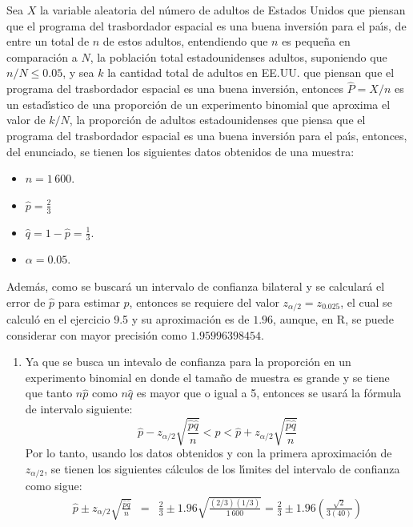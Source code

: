 \begin{solucion}
 Sea $X$ la variable aleatoria del n\'umero de adultos de Estados Unidos que piensan que el programa del trasbordador espacial es una buena inversi\'on para el pa\'{\i}s, de entre un total de $n$ de estos adultos, entendiendo que $n$ es peque\~na en comparaci\'on a $N$, la poblaci\'on total estadounidenses adultos, suponiendo que $n/N \leq 0.05$, y sea $k$ la cantidad total de adultos en EE.UU. que piensan que el programa del trasbordador espacial es una buena inversi\'on, entonces $\widehat{P} = X/n$ es un estad\'{\i}stico de una proporci\'on de un experimento binomial que aproxima el valor de $k/N$, la proporci\'on de adultos estadounidenses que piensa que el programa del trasbordador espacial es una buena inversi\'on para el pa\'{\i}s, entonces, del enunciado, se tienen los siguientes datos obtenidos de una muestra:
 \begin{itemize}
  \item $n = 1\,600$.
  \item $\hat{p}=\frac{2}{3}$
  \item $\hat{q}=1-\hat{p} = \frac{1}{3}$.
  \item $\alpha=0.05$.
 \end{itemize}
 Adem\'as, como se buscar\'a un intervalo de confianza bilateral y se calcular\'a el error de $\hat{p}$ para estimar $p$, entonces se requiere del valor $z_{\alpha/2} = z_{0.025}$, el cual se calcul\'o en el ejercicio 9.5 y su aproximaci\'on es de $1.96$, aunque, en R, se puede considerar con mayor precisi\'on como $1.95996398454$.
 \begin{enumerate}
  \item Ya que se busca un intevalo de confianza para la proporci\'on en un experimento binomial en donde el tama\~no de muestra es grande y se tiene que tanto $n\hat{p}$ como $n\hat{q}$ es mayor que o igual a 5, entonces se usar\'a la f\'ormula de intervalo siguiente:
  \begin{equation*}
   \hat{p} - z_{\alpha/2}\sqrt{\frac{\hat{p}\hat{q}}{n}} < p < \hat{p} + z_{\alpha/2}\sqrt{\frac{\hat{p}\hat{q}}{n}}
  \end{equation*}
  Por lo tanto, usando los datos obtenidos y con la primera aproximaci\'on de $z_{\alpha/2}$, se tienen los siguientes c\'alculos de los l\'{\i}mites del intervalo de confianza como sigue:
  \begin{eqnarray*}
   \hat{p} \pm z_{\alpha/2}\sqrt{\frac{\hat{p}\hat{q}}{n}} & = & \frac{2}{3} \pm 1.96\sqrt{\frac{(2/3)(1/3)}{1\,600}} = \frac{2}{3} \pm 1.96\left( \frac{\sqrt{2}}{3(40)} \right) \\

\end{eqnarray*}
\end{enumerate}
\end{solucion}
